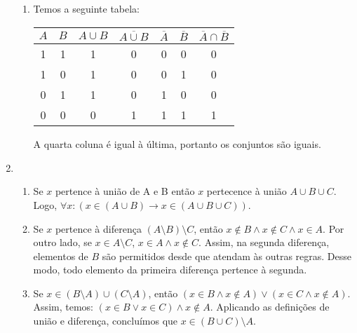 \documentclass{article}
\begin{document}
\begin{enumerate}
\begin{enumerate}
            \item Temos a seguinte tabela:

                \begin{center}

                    \begin{tabular}{c c | c c c c c } 

                        \( A \)  & \( B \) & \( A \cup B  \) & \( \overline{A \cup B} \) & \( \overline{A} \) & \( \overline{B} \) & \( \overline{A} \cap \overline{B} \) \\ [0.5ex]
                        \hline
                        1 & 1 & 1 & 0 & 0 & 0 & 0 \\ 
                        \hline
                        1 & 0 & 1 & 0 & 0 & 1 & 0 \\
                        \hline
                        0 & 1 & 1 & 0 & 1 & 0 & 0 \\
                        \hline
                        0 & 0 & 0 & 1 & 1 & 1 & 1 \\ [1ex]

                    \end{tabular}

                \end{center}

                A quarta coluna é igual à última, portanto os conjuntos são iguais.

        \end{enumerate}

    \item 

        \begin{enumerate}

            \item Se \( x \) pertence à união de A e B então \( x \) pertecence à união \( A \cup B \cup C \). Logo, \( \forall x : (x \in (A \cup B) \to x \in (A \cup B \cup C) )\).

            \item Se \( x \) pertence à diferença \( (A \setminus B) \setminus C \), então \( x \not \in B \land x \not \in C \land x \in A\). Por outro lado, se \( x \in A \setminus C\), \( x \in A \land x \not \in C \). Assim, na segunda diferença, elementos de \( B \) são permitidos desde que atendam às outras regras. Desse modo, todo elemento da primeira diferença pertence à segunda.

            \item Se \( x \in (B \setminus A) \cup (C \setminus A) \), então \(( x \in B \land x \not \in A) \lor (x \in C \land x \not \in A) \). Assim, temos: \( (x \in B \lor x \in C) \land x \not \in A\). Aplicando as definições de união e diferença, concluímos que \( x \in (B \cup C) \setminus A \).


\end{enumerate}
\end{enumerate}
\end{document}
